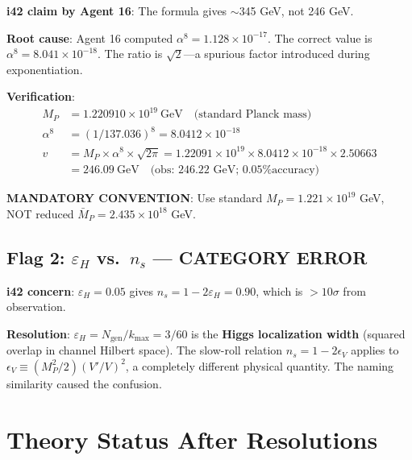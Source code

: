 \documentclass[11pt,a4paper]{article}
\begin{document}
\begin{tcolorbox}[colback=green!5!white, colframe=green!60!black,
  title={RESOLVED: $v = M_P \alpha^8 \sqrt{2\pi} = 246.09$ GeV is CORRECT}]

\textbf{i42 claim by Agent 16}: The formula gives $\sim$345 GeV, not 246 GeV.

\textbf{Root cause}: Agent 16 computed $\alpha^8 = 1.128 \times 10^{-17}$. The correct value is $\alpha^8 = 8.041 \times 10^{-18}$. The ratio is $\sqrt{2}$---a spurious factor introduced during exponentiation.

\textbf{Verification}:
\begin{align}
M_P &= 1.220910 \times 10^{19}~\text{GeV} \quad \text{(standard Planck mass)} \\
\alpha^8 &= (1/137.036)^8 = 8.0412 \times 10^{-18} \\
v &= M_P \times \alpha^8 \times \sqrt{2\pi} = 1.22091 \times 10^{19} \times 8.0412 \times 10^{-18} \times 2.50663 \\
  &= \boxed{246.09~\text{GeV}} \quad \text{(obs: 246.22 GeV; 0.05\% accuracy)}
\end{align}

\textbf{MANDATORY CONVENTION}: Use standard $M_P = 1.221 \times 10^{19}$ GeV, NOT reduced $\bar{M}_P = 2.435 \times 10^{18}$ GeV.
\end{tcolorbox}

\subsection{Flag 2: $\varepsilon_H$ vs.\ $n_s$ --- CATEGORY ERROR}

\begin{tcolorbox}[colback=green!5!white, colframe=green!60!black,
  title={RESOLVED: $\varepsilon_H$ is NOT the slow-roll parameter}]

\textbf{i42 concern}: $\varepsilon_H = 0.05$ gives $n_s = 1 - 2\varepsilon_H = 0.90$, which is $>10\sigma$ from observation.

\textbf{Resolution}: $\varepsilon_H = N_{\text{gen}}/k_{\max} = 3/60$ is the \textbf{Higgs localization width} (squared overlap in channel Hilbert space). The slow-roll relation $n_s = 1 - 2\epsilon_V$ applies to $\epsilon_V \equiv (M_P^2/2)(V'/V)^2$, a completely different physical quantity. The naming similarity caused the confusion.
\end{tcolorbox}

\section{Theory Status After Resolutions}
\end{document}
